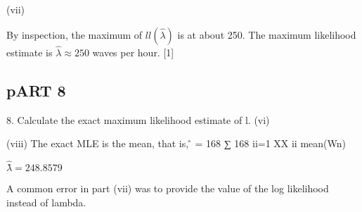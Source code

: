 \documentclass[a4paper,12pt]{article}
\begin{document}
(vii)


By inspection, the maximum of $ll(\hat{\lambda})$ is at about 250.
The maximum likelihood estimate is $\hat{\lambda} \approx 250$ waves per hour. [1]


\newpage
\subsection*{ pART 8}

8. Calculate the exact maximum likelihood estimate of l.
(vi)

(viii) The exact MLE is the mean, that is, \hat{\lambda}̂ = 168 ∑ 168
ii=1 XX ii
mean(Wn)

$\hat{\lambda}̂ =248.8579$

A common error in part (vii) was to provide the value of the log likelihood
instead of lambda.
\end{document}
